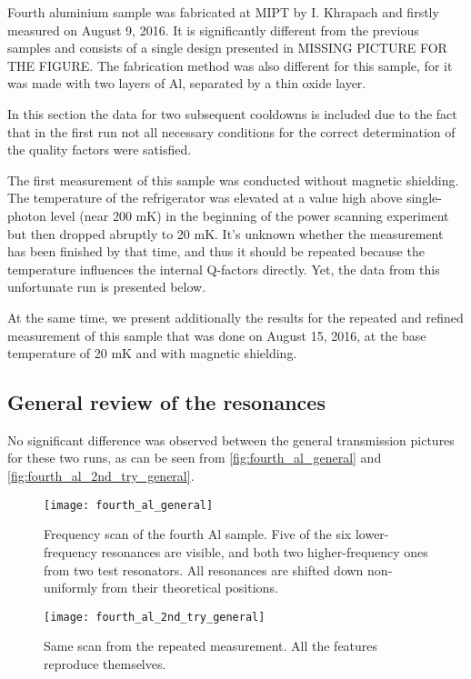 \documentclass[12pt]{article}
\numberwithin{equation}{section}
\numberwithin{figure}{section}
\begin{document}
Fourth aluminium sample was fabricated at MIPT by I. Khrapach and firstly measured on August 9, 2016. It is significantly different from the previous samples and consists of a single design presented in MISSING PICTURE FOR THE FIGURE. The fabrication method was also different for this sample, for it was made with two layers of Al, separated by a thin oxide layer.

In this section the data for two subsequent cooldowns is included due to the fact that in the first run not all necessary conditions for the correct determination of the quality factors were satisfied.

The first measurement of this sample was conducted without magnetic shielding. The temperature of the refrigerator was elevated at a value high above single-photon level (near 200 mK) in the beginning of the power scanning experiment but then dropped abruptly to 20 mK. It's unknown whether the measurement has been finished by that time, and thus it should be repeated because the temperature influences the internal Q-factors directly. Yet, the data from this unfortunate run is presented below.

At the same time, we present additionally the results for the repeated and refined measurement of this sample that was done on August 15, 2016, at the base temperature of 20 mK and with magnetic shielding. 

\subsection{General review of the resonances}

No significant difference was observed between the general transmission pictures for these two runs, as can be seen from \autoref{fig:fourth_al_general} and \autoref{fig:fourth_al_2nd_try_general}.


\begin{figure}[h]
\centering
\texttt{[image: fourth\_al\_general]}
\caption{Frequency scan of the fourth Al sample. Five of the six lower-frequency resonances are visible, and both two higher-frequency ones from two test resonators. All resonances are shifted down non-uniformly from their theoretical positions.}
\label{fig:fourth_al_general}
\end{figure}


\begin{figure}[h]
\centering
\texttt{[image: fourth\_al\_2nd\_try\_general]}
\caption{Same scan from the repeated measurement. All the features reproduce themselves.}
\label{fig:fourth_al_2nd_try_general}
\end{figure}
\end{document}
